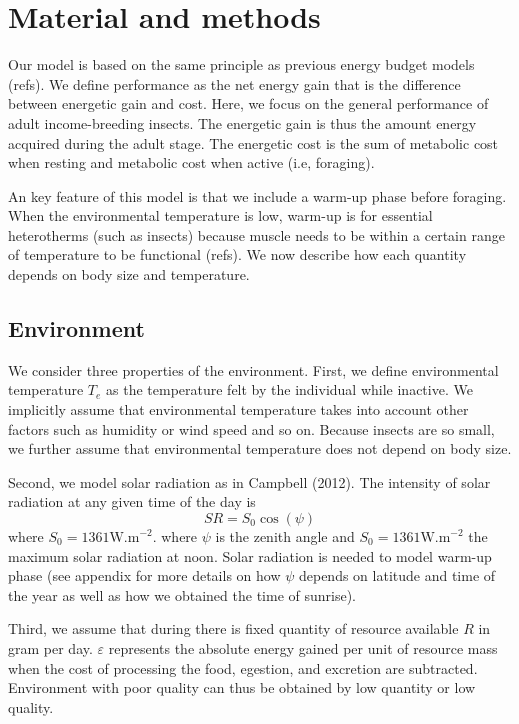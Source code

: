 \section*{Material and methods}
Our model is based on the same principle as previous energy budget models (refs).
We define performance as the net energy gain that is the difference between energetic gain and cost.
Here, we focus on the general performance of adult income-breeding insects. 
The energetic gain is thus the amount energy acquired during the adult stage.
The energetic cost is the sum of metabolic cost when resting and metabolic cost when active (i.e, foraging).

An key feature of this model is that we include a warm-up phase before foraging.
When the environmental temperature is low, warm-up is for essential heterotherms (such as insects) because muscle needs to be within a certain range of temperature to be functional (refs).
We now describe how each quantity depends on body size and temperature.

\subsection*{Environment}
We consider three properties of the environment. 
First, we define environmental temperature $T_e$ as the temperature felt by the individual while inactive.
We implicitly assume that environmental temperature takes into account other factors such as humidity or wind speed and so on.
Because insects are so small, we further assume that environmental temperature does not depend on body size.

Second, we model solar radiation as in Campbell (2012).
The intensity of solar radiation at any given time of the day is \[SR = S_0 \cos(\psi) \] where $S_0 = 1361 \mbox{W.m}^{-2}$. 
where $\psi$ is the zenith angle and $S_0 = 1361 \mbox{W.m}^{-2}$ the maximum solar radiation at noon.
Solar radiation is needed to model warm-up phase (see appendix for more details on how $\psi$ depends on latitude and time of the year as well as how we obtained the time of sunrise).

Third, we assume that during there is fixed quantity of resource available $R$ in gram per day.
$\varepsilon$ represents the absolute energy gained per unit of resource mass when the cost of processing the food, egestion, and excretion are subtracted. 
Environment with poor quality can thus be obtained by low quantity or low quality.

